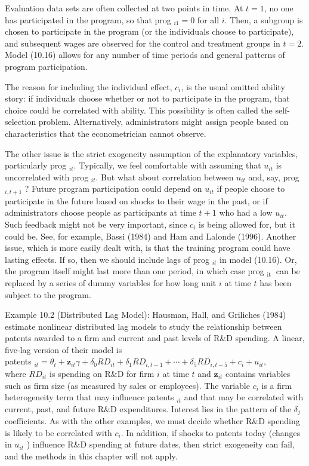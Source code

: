 \documentclass[10pt]{article}
\begin{document}
Evaluation data sets are often collected at two points in time. At $t=1$, no one has participated in the program, so that prog $_{i 1}=0$ for all $i$. Then, a subgroup is chosen to participate in the program (or the individuals choose to participate), and subsequent wages are observed for the control and treatment groups in $t=2$. Model (10.16) allows for any number of time periods and general patterns of program participation.

The reason for including the individual effect, $c_{i}$, is the usual omitted ability story: if individuals choose whether or not to participate in the program, that choice could be correlated with ability. This possibility is often called the self-selection problem. Alternatively, administrators might assign people based on characteristics that the econometrician cannot observe.

The other issue is the strict exogeneity assumption of the explanatory variables, particularly prog ${ }_{i t}$. Typically, we feel comfortable with assuming that $u_{i t}$ is uncorrelated with prog $_{i t}$. But what about correlation between $u_{i t}$ and, say, prog $_{i, t+1}$ ? Future program participation could depend on $u_{i t}$ if people choose to participate in the future based on shocks to their wage in the past, or if administrators choose people as participants at time $t+1$ who had a low $u_{i t}$. Such feedback might not be very important, since $c_{i}$ is being allowed for, but it could be. See, for example, Bassi (1984) and Ham and Lalonde (1996). Another issue, which is more easily dealt with, is that the training program could have lasting effects. If so, then we should include lags of prog $_{i t}$ in model (10.16). Or, the program itself might last more than one period, in which case prog $_{\text {it }}$ can be replaced by a series of dummy variables for how long unit $i$ at time $t$ has been subject to the program.

Example 10.2 (Distributed Lag Model): Hausman, Hall, and Griliches (1984) estimate nonlinear distributed lag models to study the relationship between patents awarded to a firm and current and past levels of R\&D spending. A linear, five-lag version of their model is\\
patents $_{i t}=\theta_{t}+\mathbf{z}_{i t} \gamma+\delta_{0} R D_{i t}+\delta_{1} R D_{i, t-1}+\cdots+\delta_{5} R D_{i, t-5}+c_{i}+u_{i t}$,\\
where $R D_{i t}$ is spending on $\mathrm{R} \& \mathrm{D}$ for firm $i$ at time $t$ and $\mathbf{z}_{i t}$ contains variables such as firm size (as measured by sales or employees). The variable $c_{i}$ is a firm heterogeneity term that may influence patents ${ }_{i t}$ and that may be correlated with current, past, and future $\mathrm{R} \& \mathrm{D}$ expenditures. Interest lies in the pattern of the $\delta_{j}$ coefficients. As with the other examples, we must decide whether $\mathrm{R} \& \mathrm{D}$ spending is likely to be correlated with $c_{i}$. In addition, if shocks to patents today (changes in $u_{i t}$ ) influence R\&D spending at future dates, then strict exogeneity can fail, and the methods in this chapter will not apply.
\end{document}
